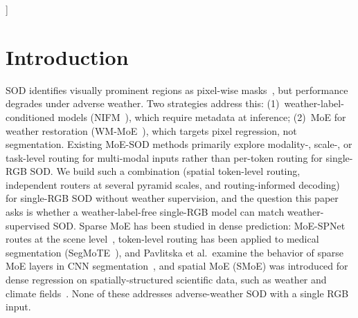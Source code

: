 \documentclass[10pt,a4paper,twocolumn,twoside]{article}
\begin{document}
{\begin{@twocolumnfalse}
\vspace{7pt}
\vspace{16pt}
\end{@twocolumnfalse}
}]
\thispagestyle{plain}
\begingroup\renewcommand\thefootnote{}
\endgroup
\section{Introduction}

SOD identifies visually prominent regions as pixel-wise masks~\cite{wang2022sodsurvey,borji2015sodbenchmark}, but performance degrades under adverse weather.
Two strategies address this: (1)~weather-label-conditioned models (NIFM~\cite{nifm2025}), which require metadata at inference; (2)~MoE for weather restoration (WM-MoE~\cite{wmmoe2023}), which targets pixel regression, not segmentation.
Existing MoE-SOD methods primarily explore modality-, scale-, or task-level routing for
multi-modal inputs rather than per-token routing for single-RGB SOD.
We build such a combination (spatial token-level routing, independent routers at several
pyramid scales, and routing-informed decoding) for single-RGB SOD without weather
supervision, and the question this paper asks is whether a weather-label-free single-RGB
model can match weather-supervised SOD. Sparse MoE has been
studied in dense prediction: MoE-SPNet routes at the scene level~\cite{moespnet}, token-level
routing has been applied to medical segmentation (SegMoTE~\cite{segmote}), and Pavlitska et
al.\ examine the behavior of sparse MoE layers in CNN segmentation~\cite{sparsemoecnn}, and
spatial MoE (SMoE) was introduced for dense regression on spatially-structured scientific data,
such as weather and climate fields~\cite{smoe}. None of these addresses
adverse-weather SOD with a single RGB input.
\end{document}
